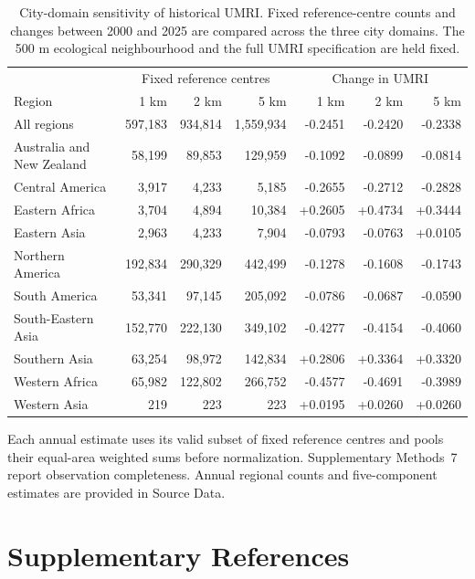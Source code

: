 \begingroup\small\setlength{\tabcolsep}{4pt}
\begin{longtable}{lrrrrrr}
\caption{City-domain sensitivity of historical UMRI. Fixed reference-centre counts and changes between 2000 and 2025 are compared across the three city domains. The 500 m ecological neighbourhood and the full UMRI specification are held fixed.}\label{tab:city_buffer_sensitivity}\\

\toprule
 & \multicolumn{3}{c}{Fixed reference centres} & \multicolumn{3}{c}{Change in UMRI} \\
Region & 1 km & 2 km & 5 km & 1 km & 2 km & 5 km \\
\midrule
All regions & 597,183 & 934,814 & 1,559,934 & -0.2451 & -0.2420 & -0.2338 \\
Australia and New Zealand & 58,199 & 89,853 & 129,959 & -0.1092 & -0.0899 & -0.0814 \\
Central America & 3,917 & 4,233 & 5,185 & -0.2655 & -0.2712 & -0.2828 \\
Eastern Africa & 3,704 & 4,894 & 10,384 & +0.2605 & +0.4734 & +0.3444 \\
Eastern Asia & 2,963 & 4,233 & 7,904 & -0.0793 & -0.0763 & +0.0105 \\
Northern America & 192,834 & 290,329 & 442,499 & -0.1278 & -0.1608 & -0.1743 \\
South America & 53,341 & 97,145 & 205,092 & -0.0786 & -0.0687 & -0.0590 \\
South-Eastern Asia & 152,770 & 222,130 & 349,102 & -0.4277 & -0.4154 & -0.4060 \\
Southern Asia & 63,254 & 98,972 & 142,834 & +0.2806 & +0.3364 & +0.3320 \\
Western Africa & 65,982 & 122,802 & 266,752 & -0.4577 & -0.4691 & -0.3989 \\
Western Asia & 219 & 223 & 223 & +0.0195 & +0.0260 & +0.0260 \\
\bottomrule
\end{longtable}
{\small Each annual estimate uses its valid subset of fixed reference centres and pools their equal-area weighted sums before normalization. Supplementary Methods~7 report observation completeness. Annual regional counts and five-component estimates are provided in Source Data.\par}
\endgroup

\clearpage

\section{Supplementary References}
\renewcommand{\bibsection}{}





